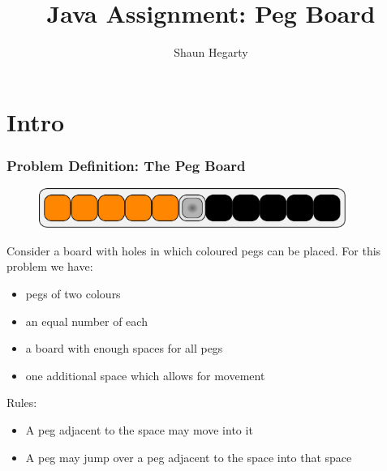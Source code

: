 \documentclass{beamer}
\begin{document}
\newcommand{\tab}{\hspace*{0.4in}} %
\newcommand{\spc}{\hspace{5pt}} %
\newcommand{\vspc}{\vspace*{0.23in}\\} %

\newcommand{\bd}{\textbf} %
\newcommand{\ita}{\textit} %
\newcommand{\ti}{\bf \LARGE} %
\newcommand{\blt}{\begin{itemize}} %
\newcommand{\finblt}{\end{itemize}} %
\newcommand{\eq}{\begin{equation}\label} %
\newcommand{\eqf}{\end{equation}}

\newcommand{\pic}[4]{
		\begin{figure}
		\texttt{[image: \#4]} 			
		\end{figure}}
		
\title{Java Assignment: Peg Board}
\author{Shaun Hegarty}

\section{Intro}

		\frame{\titlepage}


	\begin{frame}
		\frametitle{Problem Definition: The Peg Board}
		\begin{figure}
		\includegraphics[width=10cm]{pegboardlayout}
		\end{figure}
		Consider a board with holes in which coloured pegs can be placed. For this problem we have: 
		\begin{itemize}
			\item pegs of two colours
			\item an equal number of each
			\item a board with enough spaces for all pegs
			\item one additional space which allows for movement
		\end{itemize}
		Rules:
		\begin{itemize}
			\item A peg adjacent to the space may move into it
			\item A peg may jump over a peg adjacent to the space into that space
		\end{itemize}	
		
	\end{frame}
		
\end{document}
